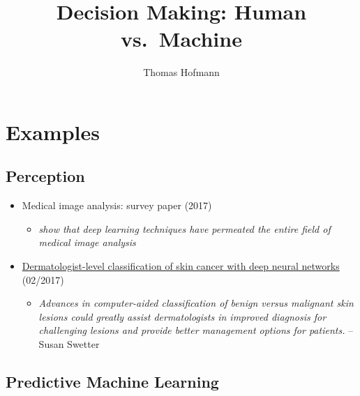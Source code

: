 \documentclass{article}
\title{
	Decision Making: Human vs.~Machine
}
\author{Thomas Hofmann}
\begin{document}
\maketitle 


\section{Examples}

\subsection{Perception}

\begin{itemize}
\item Medical image analysis: survey paper (2017) \cite{litjens2017survey}
\begin{itemize}
\item \textit{show that deep learning techniques have permeated
the entire field of medical image analysis}
\end{itemize}
\item \href{https://www.nature.com/articles/nature21056}{Dermatologist-level classification of skin cancer with deep neural networks} (02/2017)
\cite{esteva2017dermatologist}
\begin{itemize}
\item \textit{Advances in computer-aided classification of benign versus malignant skin lesions could greatly assist dermatologists in improved diagnosis for challenging lesions and provide better management options for patients.} -- Susan Swetter
\end{itemize}
\end{itemize}

\subsection{Predictive Machine Learning}
\end{document}
